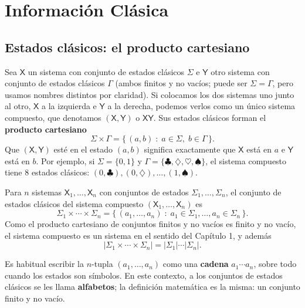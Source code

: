 \documentclass[11pt, a4paper, twoside, openright]{report}
\begin{document}
\cleardoublepage
\section{Información Clásica}

\subsection{Estados clásicos: el producto cartesiano}

\noindent Sea $\mathsf{X}$ un sistema con conjunto de estados clásicos $\Sigma$ e $\mathsf{Y}$ otro sistema con conjunto de estados clásicos $\Gamma$ (ambos finitos y no vacíos; puede ser $\Sigma = \Gamma$, pero usamos nombres distintos por claridad). Si colocamos los dos sistemas uno junto al otro, $\mathsf{X}$ a la izquierda e $\mathsf{Y}$ a la derecha, podemos verlos como un único sistema compuesto, que denotamos $(\mathsf{X}, \mathsf{Y})$ o $\mathsf{XY}$. Sus estados clásicos forman el \textbf{producto cartesiano}
\[ \Sigma \times \Gamma = \{\, (a, b) \;:\; a \in \Sigma, \; b \in \Gamma \,\}. \]
Que $(\mathsf{X}, \mathsf{Y})$ esté en el estado $(a,b)$ significa exactamente que $\mathsf{X}$ está en $a$ e $\mathsf{Y}$ está en $b$. Por ejemplo, si $\Sigma = \{0,1\}$ y $\Gamma = \{\clubsuit, \diamondsuit, \heartsuit, \spadesuit\}$, el sistema compuesto tiene $8$ estados clásicos: $(0,\clubsuit), (0,\diamondsuit), \dots, (1,\spadesuit)$.

\noindent Para $n$ sistemas $\mathsf{X}_1, \dots, \mathsf{X}_n$ con conjuntos de estados $\Sigma_1, \dots, \Sigma_n$, el conjunto de estados clásicos del sistema compuesto $(\mathsf{X}_1, \dots, \mathsf{X}_n)$ es
\[ \Sigma_1 \times \cdots \times \Sigma_n = \{\, (a_1, \dots, a_n) \;:\; a_1 \in \Sigma_1, \dots, a_n \in \Sigma_n \,\}. \]
Como el producto cartesiano de conjuntos finitos y no vacíos es finito y no vacío, el sistema compuesto es un sistema en el sentido del Capítulo 1, y además
\[ |\Sigma_1 \times \cdots \times \Sigma_n| = |\Sigma_1| \cdots |\Sigma_n|. \]

\noindent Es habitual escribir la $n$-tupla $(a_1, \dots, a_n)$ como una \textbf{cadena} $a_1 \cdots a_n$, sobre todo cuando los estados son símbolos. En este contexto, a los conjuntos de estados clásicos se les llama \textbf{alfabetos}; la definición matemática es la misma: un conjunto finito y no vacío.
\end{document}

